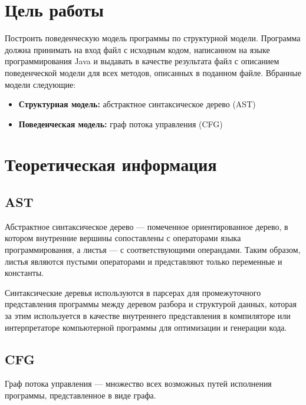 







\section{Цель работы}

Построить поведенческую модель программы по структурной модели. Программа должна принимать на вход файл с исходным кодом, написанном на языке программирования Java и выдавать в качестве результата файл с описанием поведенческой модели для всех методов, описанных в поданном файле. Вбранные модели следующие:
\begin{itemize}
\item \textbf{Структурная модель:} абстрактное синтаксическое дерево (AST)
\item \textbf{Поведенческая модель:} граф потока управления (CFG)
\end{itemize}

\section{Теоретическая информация}

\subsection{AST}

Абстрактное синтаксическое дерево --- помеченное ориентированное дерево, в котором внутренние вершины сопоставлены с операторами языка программирования, а листья --- с соответствующими операндами. Таким образом, листья являются пустыми операторами и представляют только переменные и константы. 

Синтаксические деревья используются в парсерах для промежуточного представления программы между деревом разбора и структурой данных, которая за этим используется в качестве внутреннего представления в компиляторе или интерпретаторе компьютерной программы для оптимизации и генерации кода. 

\subsection{CFG}

Граф потока управления --- множество всех возможных путей исполнения программы, представленное в виде графа. 

